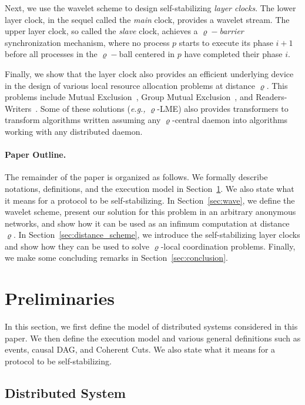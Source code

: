 \documentclass[11pt]{article}
\newcommand{\eg}{\emph{e.g., }}
\begin{document}
Next, we use the wavelet scheme to design self-stabilizing \emph{layer clocks}.
The lower layer clock, in the sequel called the \emph{main} clock, provides a wavelet stream. 
The upper layer clock, so called the \emph{slave} clock, achieves a $\varrho-$\emph{barrier} synchronization
mechanism, where no process $p$ starts 
to execute its phase $i+1$ before all processes in the $\varrho-$ball centered in $p$ have completed their phase $i$.

Finally, we show that the layer clock also provides an efficient underlying device in the design of 
various local resource allocation problems at distance $\varrho$.  This problems include
Mutual Exclusion~\cite{D65}, Group Mutual Exclusion~\cite{Jou00}, and Readers-Writers~\cite{CHP71}.
Some of these solutions (\eg $\varrho$-LME) also provides transformers 
to transform algorithms written assuming any $\varrho$-central daemon into algorithms working 
with any distributed daemon.


\paragraph{Paper Outline.}

The remainder of the paper is organized as follows. 
We formally describe notations, definitions, and the execution model in Section~\ref{sec:prel}. We also 
state what it means for a protocol to be self-stabilizing. 
In Section~\ref{sec:wave}, we define the wavelet scheme, present our solution for this problem in an arbitrary anonymous networks, 
and show how it can be used as an infimum computation at distance $\varrho$. 
In Section~\ref{sec:distance_scheme},  we introduce the self-stabilizing layer clocks and show how they can be used 
to solve $\varrho$-local coordination problems. Finally, we make some concluding remarks in Section~\ref{sec:conclusion}.

\section{Preliminaries}
\label{sec:prel}

In this section, we first define the model of distributed systems 
considered in this paper.  We then define the execution model and various general definitions such as events, causal DAG, and Coherent Cuts.
We also state what it means for a protocol to be self-stabilizing.  

\subsection{Distributed System}
\end{document}
